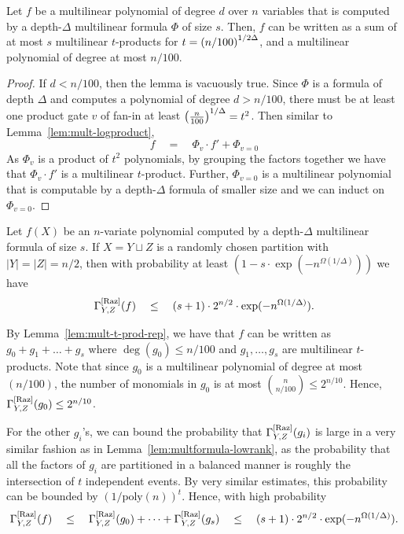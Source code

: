 \begin{lemma}\label{lem:mult-t-prod-rep}
Let $f$ be a multilinear polynomial of degree $d$ over $n$ variables that is computed by a depth-$\Delta$ multilinear formula $\Phi$ of size $s$. Then, $f$ can be written as a sum of at most $s$ multilinear $t$-products for $t = \left(n/100\right)^{1/2\Delta}$, and a multilinear polynomial of degree at most $n/100$.  
\end{lemma}
\begin{proof}
If $d < n/100$, then the lemma is vacuously true. Since $\Phi$ is a formula of depth $\Delta$ and computes a polynomial of degree $d > n/100$, there must be at least one product gate $v$ of fan-in at least $\left(\frac{n}{100}\right)^{1/\Delta} = t^2$. Then similar to Lemma~\ref{lem:mult-logproduct}, 
$$
f \quad=\quad \Phi_v \cdot f'  + \Phi_{v=0}
$$
As $\Phi_v$ is a product of $t^2$ polynomials, by grouping the factors together we have that $\Phi_v \cdot f'$ is a multilinear $t$-product. Further, $\Phi_{v=0}$ is a multilinear polynomial that is computable by a depth-$\Delta$ formula of smaller size and we can induct on $\Phi_{v=0}$. 
\end{proof}

\begin{lemma}\label{lem:mult-const-depth-upper-bound}
Let $f(X)$ be an $n$-variate polynomial computed by a depth-$\Delta$ multilinear formula of size $s$. If $X = Y \sqcup Z$ is a randomly chosen partition with $|Y| = |Z| = n/2$, then with probability at least $(1 - s \cdot \exp({-n^{\Omega(1/\Delta)}}))$ we have
$$
\Gamma^{\mathrm{[Raz]}}_{Y,Z}(f) \quad\leq\quad (s+1) \cdot 2^{n/2} \cdot \exp(-n^{\Omega(1/\Delta)}).
$$
\end{lemma}
\begin{proof-sketch}
By Lemma~\ref{lem:mult-t-prod-rep}, we have that $f$ can be written as $g_0 + g_1 + \dots + g_s$ where $\deg(g_0) \leq n/100$ and $g_1,\dots, g_s$ are multilinear $t$-products. Note that since $g_0$ is a multilinear polynomial of degree at most $(n/100)$, the number of monomials in $g_0$ is at most $\binom{n}{n/100} \leq 2^{n/10}$. Hence, $\Gamma^{\mathrm{[Raz]}}_{Y,Z}(g_0) \leq 2^{n/10}$. 

For the other $g_i$'s, we can bound the probability that $\Gamma^{\mathrm{[Raz]}}_{Y,Z}(g_i)$ is large in a very similar fashion as in Lemma~\ref{lem:multformula-lowrank}, as the probability that all the factors of $g_i$ are partitioned in a balanced manner is roughly the intersection of $t$ independent events. By very similar estimates, this probability can be bounded by $(1/\mathrm{poly}(n))^t$. Hence, with high probability 
$$
\Gamma^{\mathrm{[Raz]}}_{Y,Z}(f) \quad \leq \quad \Gamma^{\mathrm{[Raz]}}_{Y,Z}(g_0) + \dots + \Gamma^{\mathrm{[Raz]}}_{Y,Z}(g_s) \quad \leq \quad (s+1)\cdot 2^{n/2} \cdot \exp(-n^{\Omega(1/\Delta)}).
$$
\end{proof-sketch}

